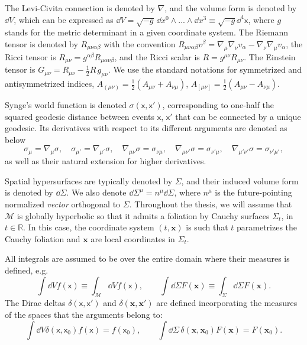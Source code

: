 \documentclass[letterpaper,12pt,titlepage,oneside,final]{book}
\newcommand{\M}{\mathcal{M}}
\newcommand{\mf}{\mathsf}%
\begin{document}
The Levi-Civita connection is denoted by $\nabla$, and the volume form is denoted by $\dd V$, which can be expressed as $\dd V = \sqrt{-g} \,\dd x^0\wedge... \wedge \dd x^3 \equiv \sqrt{-g} \dd^4 \mf x$, where $g$ stands for the metric determinant in a given coordinate system. The Riemann tensor is denoted by $R_{\mu\nu\alpha\beta}$ with the convention {$R_{\mu\nu\alpha\beta}v^\beta = \nabla_\mu \nabla_\nu v_\alpha - \nabla_\nu \nabla_\mu v_\alpha$}, the Ricci tensor is $R_{\mu\nu} = g^{\alpha\beta} R_{\mu\alpha\nu \beta}$, and the Ricci scalar is $R  = g^{\mu\nu}R_{\mu\nu}$. The Einstein tensor is $G_{\mu\nu} = R_{\mu\nu} - \tfrac{1}{2} R\, g_{\mu\nu}$. We use the standard notations for symmetrized and antisymmetrized indices, $A_{(\mu\nu)} = \tfrac{1}{2}(A_{\mu\nu} + A_{\nu\mu})$, $A_{[\mu\nu]} = \tfrac{1}{2}(A_{\mu\nu} - A_{\nu\mu})$.


Synge's world function is denoted $\sigma(\mf x, \mf x')$, corresponding to one-half the squared geodesic distance between events $\mf x$, $\mf x'$ that can be connected by a unique geodesic. Its derivatives with respect to its different arguments are denoted as below
\begin{equation}
    \sigma_\mu = \nabla_\mu \sigma, \quad \sigma_{\mu'} = \nabla_{\mu'}\sigma, \quad \nabla_{\mu\nu}\sigma = \sigma_{\nu\mu}, \quad \nabla_{\mu\nu'}\sigma = \sigma_{\nu'\mu}, \quad \nabla_{\mu'\nu'}\sigma = \sigma_{\nu'\mu'},
\end{equation}
as well as their natural extension for higher derivatives.

Spatial hypersurfaces are typically denoted by $\Sigma$, and their induced volume form is denoted by $\dd \Sigma$. We also denote $\dd\Sigma^\mu = n^\mu \dd \Sigma$, where $n^\mu$ is the future-pointing normalized \textit{vector} orthogonal to $\Sigma$.
Throughout the thesis, we will assume that $\M$ is globally hyperbolic so that it admits a foliation by Cauchy surfaces $\Sigma_t$, in $t\in \mathbb{R}$. In this case, the coordinate system $(t,\bm x)$ is such that $t$ parametrizes the Cauchy foliation and $\bm x$ are local coordinates in $\Sigma_t$.

All integrals are assumed to be over the entire domain where their measures is defined, e.g.
\begin{equation}
    \int\dd V f(\mf x) \equiv \int_{\M}\dd V f(\mf x),\quad\quad \int\dd \Sigma F(\bm x) \equiv \int_{\Sigma}\dd \Sigma F(\bm x).
\end{equation}
The Dirac deltas $\delta(\mf x, \mf x')$ and $\delta(\bm x, \bm x')$ are defined incorporating the measures of the spaces that the arguments belong to:
\begin{equation}
    \int \dd V \delta(\mf x, \mf x_0) f(\mf x) = f(\mf x_0), \quad\quad\int \dd \Sigma\, \delta(\bm x, \bm x_0) F(\bm x) = F(\bm x_0).
\end{equation}
\end{document}
